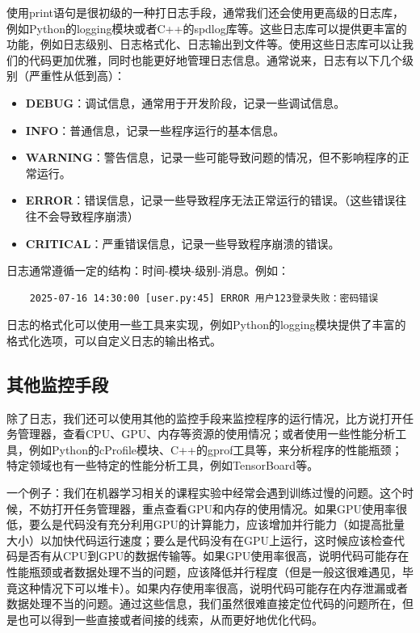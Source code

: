 使用print语句是很初级的一种打日志手段，通常我们还会使用更高级的日志库，例如Python的logging模块或者C++的spdlog库等。这些日志库可以提供更丰富的功能，例如日志级别、日志格式化、日志输出到文件等。使用这些日志库可以让我们的代码更加优雅，同时也能更好地管理日志信息。通常说来，日志有以下几个级别（严重性从低到高）：
\begin{itemize}
  \item \textbf{DEBUG}：调试信息，通常用于开发阶段，记录一些调试信息。
  \item \textbf{INFO}：普通信息，记录一些程序运行的基本信息。
  \item \textbf{WARNING}：警告信息，记录一些可能导致问题的情况，但不影响程序的正常运行。
  \item \textbf{ERROR}：错误信息，记录一些导致程序无法正常运行的错误。（这些错误往往不会导致程序崩溃）
  \item \textbf{CRITICAL}：严重错误信息，记录一些导致程序崩溃的错误。
\end{itemize}

日志通常遵循一定的结构：时间-模块-级别-消息。例如：
\begin{verbatim}
    2025-07-16 14:30:00 [user.py:45] ERROR 用户123登录失败：密码错误
\end{verbatim}

日志的格式化可以使用一些工具来实现，例如Python的logging模块提供了丰富的格式化选项，可以自定义日志的输出格式。

\subsection{其他监控手段}\label{subsec:other-monitoring}

除了日志，我们还可以使用其他的监控手段来监控程序的运行情况，比方说打开任务管理器，查看CPU、GPU、内存等资源的使用情况；或者使用一些性能分析工具，例如Python的cProfile模块、C++的gprof工具等，来分析程序的性能瓶颈；特定领域也有一些特定的性能分析工具，例如TensorBoard等。

一个例子：我们在机器学习相关的课程实验中经常会遇到训练过慢的问题。这个时候，不妨打开任务管理器，重点查看GPU和内存的使用情况。如果GPU使用率很低，要么是代码没有充分利用GPU的计算能力，应该增加并行能力（如提高批量大小）以加快代码运行速度；要么是代码没有在GPU上运行，这时候应该检查代码是否有从CPU到GPU的数据传输等。如果GPU使用率很高，说明代码可能存在性能瓶颈或者数据处理不当的问题，应该降低并行程度（但是一般这很难遇见，毕竟这种情况下可以堆卡）。如果内存使用率很高，说明代码可能存在内存泄漏或者数据处理不当的问题。通过这些信息，我们虽然很难直接定位代码的问题所在，但是也可以得到一些直接或者间接的线索，从而更好地优化代码。

